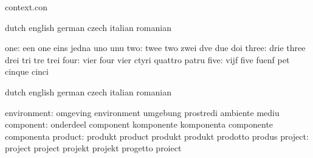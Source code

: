 



\startlogginginterface context.con



\startvariables            dutch                     english
                           german                    czech
                           italian                   romanian

                      one: een                       one
                           eins                      jedna
                           uno                       unu
                      two: twee                      two
                           zwei                      dve
                           due                       doi
                    three: drie                      three
                           drei                      tri
                           tre                       trei
                     four: vier                      four
                           vier                      ctyri
                           quattro                   patru
                     five: vijf                      five
                           fuenf                     pet
                           cinque                    cinci
\stopvariables


\startvariables            dutch                     english
                           german                    czech
                           italian                   romanian

              environment: omgeving                  environment
                           umgebung                  prostredi
                           ambiente                  mediu
                component: onderdeel                 component
                           komponente                komponenta
                           componente                componenta
                  product: produkt                   product
                           produkt                   produkt
                           prodotto                  produs
                  project: project                   project
                           projekt                   projekt
                           progetto                  proiect

